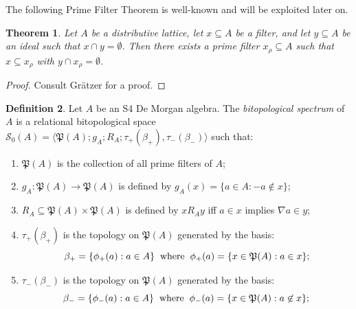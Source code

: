 \documentclass{amsart}
\theoremstyle{plain}
\newtheorem{theorem}{Theorem}[section]
\theoremstyle{definition}
\newtheorem{definition}[theorem]{Definition}
\begin{document}
The following Prime Filter Theorem is well-known and will be exploited later on. 
 \begin{theorem}\label{prime filter theorem}
     Let $A$ be a distributive lattice, let $x\subseteq A$ be a filter, and let $y\subseteq A$ be an ideal such that $x\cap y=\emptyset$. Then there exists a prime filter $x_\rho\subseteq A$ such that $x\subseteq x_\rho$ with $y\cap x_\rho=\emptyset$. 
 \end{theorem}
 \begin{proof}
 Consult Gr\"atzer \cite[pg. 84]{gratzer} for a proof. 
 \end{proof}
\begin{definition}
    Let $A$ be an S4 De Morgan algebra. The \emph{bitopological spectrum} of $A$ is a relational bitopological space $\mathcal{S}_0(A)=\langle\mathfrak{P}(A);g_A;R_A;\tau_+(\beta_+),\tau_-(\beta_-)\rangle$ such that: 
    \begin{enumerate}
        \item $\mathfrak{P}(A)$ is the collection of all prime filters of $A$; 
        \item $g_A\colon\mathfrak{P}(A)\to\mathfrak{P}(A)$ is defined by $g_A(x)=\{a\in A:-a\not\in x\}$; 
        \item $R_A\subseteq\mathfrak{P}(A)\times\mathfrak{P}(A)$ is defined by $xR_Ay$ iff $a\in x$ implies $\nabla a\in y$; 
        \item $\tau_+(\beta_+)$ is the topology on $\mathfrak{P}(A)$ generated by the basis: \[\beta_+=\{\phi_+(a) : a \in A\}\hspace{.2cm}\text{where}\hspace{.2cm}\phi_+(a)=\{x\in\mathfrak{P}(A):a\in x\};\]
        \item $\tau_-(\beta_-)$ is the topology on $\mathfrak{P}(A)$ generated by the basis: 
        \[\beta_-=\{\phi_-(a) : a \in A\}\hspace{.2cm}\text{where}\hspace{.2cm}\phi_-(a)=\{x\in\mathfrak{P}(A):a\not\in x\};\]
    \end{enumerate}
\end{definition}
\end{document}
